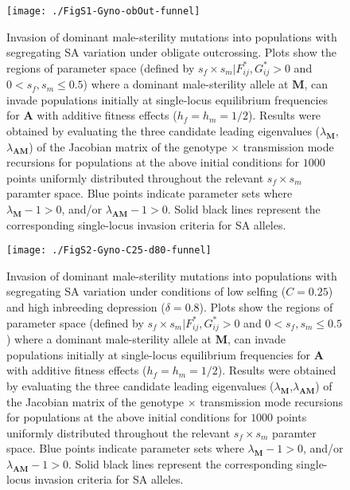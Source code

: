 \documentclass{article}
\begin{document}
\begin{figure}[ht!]
\centering
\texttt{[image: ./FigS1-Gyno-obOut-funnel]}
\caption{Invasion of dominant male-sterility mutations into populations with segregating SA variation under obligate outcrossing. Plots show the regions of parameter space (defined by $s_f \times s_m | F^{\ast}_{ij},G^{\ast}_{ij} > 0$ and $0 < s_f,s_m \leq 0.5$) where a dominant male-sterility allele at $\mathbf{M}$, can invade populations initially at single-locus equilibrium frequencies for $\mathbf{A}$ with additive fitness effects ($h_f=h_m=1/2$). Results were obtained by evaluating the three candidate leading eigenvalues ($\lambda_{\mathbf{M}}$,$\lambda_{\mathbf{AM}}$) of the Jacobian matrix of the genotype $\times$ transmission mode recursions for populations at the above initial conditions for $1000$ points uniformly distributed throughout the relevant $s_f \times s_m$ paramter space. Blue points indicate parameter sets where $\lambda_{\mathbf{M}} - 1 > 0$, and/or $\lambda_{\mathbf{AM}} - 1 > 0$. Solid black lines represent the corresponding single-locus invasion criteria for SA alleles.}
\label{fig:GynObOutFunnel}
\end{figure}
\newpage{}

\begin{figure}[ht!]
\centering
\texttt{[image: ./FigS2-Gyno-C25-d80-funnel]}
\caption{Invasion of dominant male-sterility mutations into populations with segregating SA variation under conditions of low selfing ($C = 0.25$) and high inbreeding depression ($\delta = 0.8$). Plots show the regions of parameter space (defined by $s_f \times s_m | F^{\ast}_{ij},G^{\ast}_{ij} > 0$ and $0 < s_f,s_m \leq 0.5$) where a dominant male-sterility allele at $\mathbf{M}$, can invade populations initially at single-locus equilibrium frequencies for $\mathbf{A}$ with additive fitness effects ($h_f=h_m=1/2$). Results were obtained by evaluating the three candidate leading eigenvalues ($\lambda_{\mathbf{M}}$,$\lambda_{\mathbf{AM}}$) of the Jacobian matrix of the genotype $\times$ transmission mode recursions for populations at the above initial conditions for $1000$ points uniformly distributed throughout the relevant $s_f \times s_m$ paramter space. Blue points indicate parameter sets where $\lambda_{\mathbf{M}} - 1 > 0$, and/or $\lambda_{\mathbf{AM}} - 1 > 0$. Solid black lines represent the corresponding single-locus invasion criteria for SA alleles.}
\label{fig:GynC25d80Funnel}
\end{figure}
\newpage{}
\end{document}
